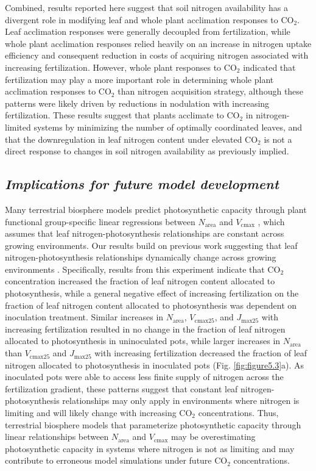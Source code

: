 Combined, results reported here suggest that soil nitrogen availability has a divergent role in modifying leaf and whole plant acclimation responses to CO$_2$. Leaf acclimation responses were generally decoupled from fertilization, while whole plant acclimation responses relied heavily on an increase in nitrogen uptake efficiency and consequent reduction in costs of acquiring nitrogen associated with increasing fertilization. However, whole plant responses to CO$_2$ indicated that fertilization may play a more important role in determining whole plant acclimation responses to CO$_2$ than nitrogen acquisition strategy, although these patterns were likely driven by reductions in nodulation with increasing fertilization. These results suggest that plants acclimate to CO$_2$ in nitrogen-limited systems by minimizing the number of optimally coordinated leaves, and that the downregulation in leaf nitrogen content under elevated CO$_2$ is not a direct response to changes in soil nitrogen availability as previously implied.

\subsection{\textit{Implications for future model development}}
Many terrestrial biosphere models predict photosynthetic capacity through plant functional group-specific linear regressions between $N_\mathrm{area}$ and $V_\mathrm{cmax}$ , which assumes that leaf nitrogen-photosynthesis relationships are constant across growing environments. Our results build on previous work suggesting that leaf nitrogen-photosynthesis relationships dynamically change across growing environments . Specifically, results from this experiment indicate that CO$_2$ concentration increased the fraction of leaf nitrogen content allocated to photosynthesis, while a general negative effect of increasing fertilization on the fraction of leaf nitrogen content allocated to photosynthesis was dependent on inoculation treatment. Similar increases in $N_\mathrm{area}$, $V_\mathrm{cmax25}$, and $J_\mathrm{max25}$ with increasing fertilization resulted in no change in the fraction of leaf nitrogen allocated to photosynthesis in uninoculated pots, while larger increases in $N_\mathrm{area}$ than $V_\mathrm{cmax25}$ and $J_\mathrm{max25}$ with increasing fertilization decreased the fraction of leaf nitrogen allocated to photosynthesis in inoculated pots (Fig. \ref{fig:figure5.3}a). As inoculated pots were able to access less finite supply of nitrogen across the fertilization gradient, these patterns suggest that constant leaf nitrogen-photosynthesis relationships may only apply in environments where nitrogen is limiting and will likely change with increasing CO$_2$ concentrations. Thus, terrestrial biosphere models that parameterize photosynthetic capacity through linear relationships between $N_\mathrm{area}$ and $V_\mathrm{cmax}$  may be overestimating photosynthetic capacity in systems where nitrogen is not as limiting and may contribute to erroneous model simulations under future CO$_2$ concentrations.

